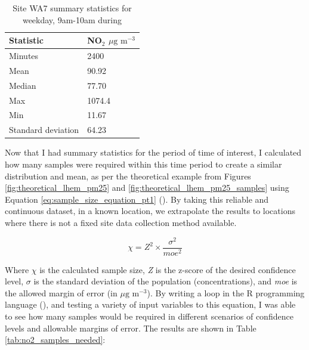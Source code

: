 \begin{table}[H]
\centering
    \begin{tabular}{ | l | l |}
    \hline 
     \bfseries{Statistic}   & \bfseries{NO$_{2}$ $\mu \text{g m}^{-3}$}    \\ \hline
     Minutes                & 2400                                         \\ \hline
     Mean                   & 90.92                                        \\ \hline
     Median                 & 77.70                                        \\ \hline
     Max                    & 1074.4                                       \\ \hline
     Min                    & 11.67                                        \\ \hline
     Standard deviation     & 64.23                                        \\ \hline
    \end{tabular}
\caption{Site WA7 summary statistics for weekday, 9am-10am during}
\label{tab:wa7_summary_stats}
\end{table}

Now that I had summary statistics for the period of time of interest, I calculated how many samples were required within this time period to create a similar distribution and mean, as per the theoretical example from Figures \ref{fig:theoretical_lhem_pm25} and \ref{fig:theoretical_lhem_pm25_samples} using Equation \ref{eq:sample_size_equation_pt1} (\cite{PennStateEberlyCollegeofScience2017}). By taking this reliable and continuous dataset, in a known location, we extrapolate the results to locations where there is not a fixed site data collection method available.

\begin{equation}
  \chi = \textit{Z}^2 \times \frac{\sigma^2}{moe^2} 
  \label{eq:sample_size_equation_pt1}
\end{equation}

Where $\chi$ is the calculated sample size, \textit{Z} is the z-score of the desired confidence level, $\sigma$ is the standard deviation of the population (concentrations), and \textit{moe} is the allowed margin of error (in $\mu \text{g m}^{-3}$). By writing a loop in the R programming language (\cite{RFoundationforStatisticalComputing2014}), and testing a variety of input variables to this equation, I was able to see how many samples would be required in different scenarios of confidence levels and allowable margins of error. The results are shown in Table \ref{tab:no2_samples_needed}:

